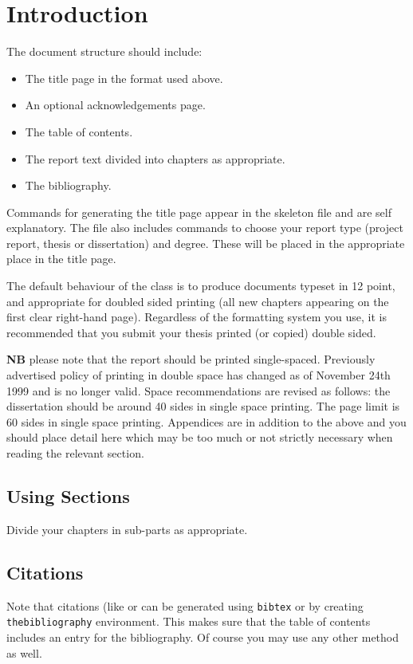 \section{Introduction}

The document structure should include:
\begin{itemize}
\item
The title page  in the format used above.
\item
An optional acknowledgements page.
\item
The table of contents.
\item
The report text divided into chapters as appropriate.
\item
The bibliography.
\end{itemize}

Commands for generating the title page appear in the skeleton file and
are self explanatory.
The file also includes commands to choose your report type (project
report, thesis or dissertation) and degree.
These will be placed in the appropriate place in the title page. 

The default behaviour of the class is to produce documents typeset in
12 point, 
and appropriate for doubled sided printing
(all new chapters appearing on the first clear right-hand page).
Regardless of the formatting system you use, 
it is recommended that you submit your thesis printed (or copied) 
double sided. 

{\bf NB} please note that the report should be printed single-spaced.
Previously advertised policy of printing in double space has changed
as of November 24th 1999 and is no longer valid.
Space recommendations are revised as follows: 
the dissertation should be around 40 sides in single space printing.
The page limit is 60 sides in single space printing.  Appendices are in
addition to the above and you should place detail here which may be too
much or not strictly necessary when reading the relevant section.

\subsection{Using Sections}

Divide your chapters in sub-parts as appropriate.

\subsection{Citations}

Note that citations 
(like \cite{Diffie1976} or \cite{Dolev1983}
can be generated using {\tt bibtex} or by
creating {\tt thebibliography} environment. This makes sure that the
table of contents includes an entry for the bibliography.
Of course you may use any other method as well.


